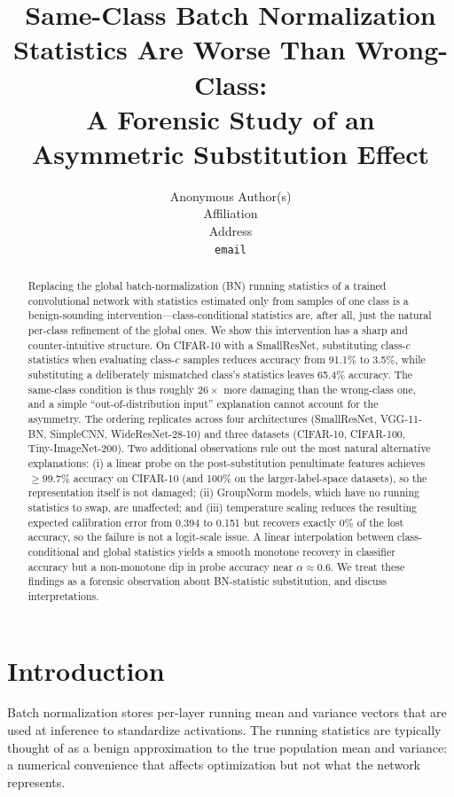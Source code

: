 \documentclass{article}
\title{Same-Class Batch Normalization Statistics Are Worse Than Wrong-Class:\\A Forensic Study of an Asymmetric Substitution Effect}
\author{%
  Anonymous Author(s)\\
  Affiliation\\
  Address\\
  \texttt{email}
}
\begin{document}
\maketitle

\begin{abstract}
Replacing the global batch-normalization (BN) running statistics of a trained convolutional network with statistics estimated only from samples of one class is a benign-sounding intervention---class-conditional statistics are, after all, just the natural per-class refinement of the global ones. We show this intervention has a sharp and counter-intuitive structure. On CIFAR-10 with a SmallResNet, substituting class-$c$ statistics when evaluating class-$c$ samples reduces accuracy from 91.1\% to 3.5\%, while substituting a deliberately mismatched class's statistics leaves 65.4\% accuracy. The same-class condition is thus roughly $26\times$ more damaging than the wrong-class one, and a simple ``out-of-distribution input'' explanation cannot account for the asymmetry. The ordering replicates across four architectures (SmallResNet, VGG-11-BN, SimpleCNN, WideResNet-28-10) and three datasets (CIFAR-10, CIFAR-100, Tiny-ImageNet-200). Two additional observations rule out the most natural alternative explanations: (i) a linear probe on the post-substitution penultimate features achieves $\geq 99.7\%$ accuracy on CIFAR-10 (and 100\% on the larger-label-space datasets), so the representation itself is not damaged; (ii) GroupNorm models, which have no running statistics to swap, are unaffected; and (iii) temperature scaling reduces the resulting expected calibration error from 0.394 to 0.151 but recovers exactly 0\% of the lost accuracy, so the failure is not a logit-scale issue. A linear interpolation between class-conditional and global statistics yields a smooth monotone recovery in classifier accuracy but a non-monotone dip in probe accuracy near $\alpha\approx 0.6$. We treat these findings as a forensic observation about BN-statistic substitution, and discuss interpretations.
\end{abstract}

\section{Introduction}
\label{sec:intro}

Batch normalization \citep{ioffe2015batch} stores per-layer running mean and variance vectors that are used at inference to standardize activations. The running statistics are typically thought of as a benign approximation to the true population mean and variance: a numerical convenience that affects optimization but not what the network represents.
\end{document}
